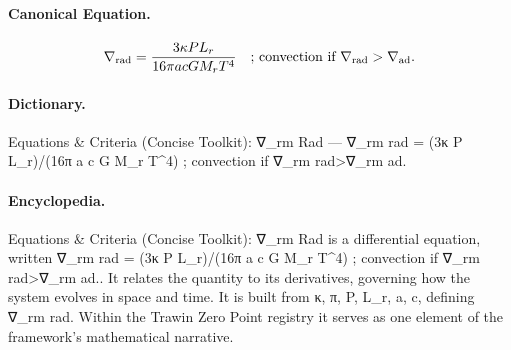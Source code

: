 \paragraph{Canonical Equation.}
\[
\nabla_{\rm rad} = \frac{3\kappa P L_r}{16\pi a c G M_r T^4} \quad\text{; convection if }\nabla_{\rm rad}>\nabla_{\rm ad}.
\]

\paragraph{Dictionary.}
Equations \& Criteria (Concise Toolkit): ∇\_rm Rad — ∇\_rm rad = (3κ P L\_r)/(16π a c G M\_r T\textasciicircum{}4) ; convection if ∇\_rm rad>∇\_rm ad.

\paragraph{Encyclopedia.}
Equations \& Criteria (Concise Toolkit): ∇\_rm Rad is a differential equation, written ∇\_rm rad = (3κ P L\_r)/(16π a c G M\_r T\textasciicircum{}4) ; convection if ∇\_rm rad>∇\_rm ad.. It relates the quantity to its derivatives, governing how the system evolves in space and time. It is built from κ, π, P, L\_r, a, c, defining ∇\_rm rad. Within the Trawin Zero Point registry it serves as one element of the framework's mathematical narrative.
